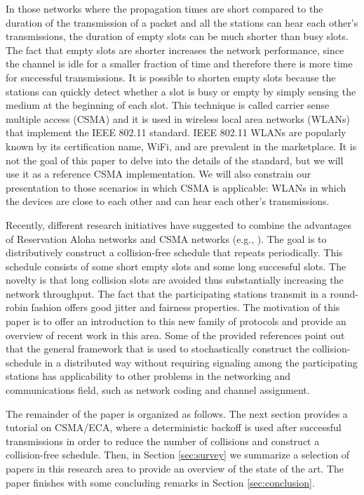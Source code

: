 \documentclass[journal]{IEEEtran}
\begin{document}
In those networks where the propagation times are short compared to the duration of the transmission of a packet and all the stations can hear each other's transmissions, the duration of empty slots can be much shorter than busy slots.
The fact that empty slots are shorter increases the network performance, since the channel is idle for a smaller fraction of time and therefore there is more time for successful transmissions.
It is possible to shorten empty slots because the stations can quickly detect whether a slot is busy or empty by simply sensing the medium at the beginning of each slot.
This technique is called carrier sense multiple access (CSMA) and  it is used in wireless local area networks (WLANs) that implement the IEEE 802.11 standard.
IEEE 802.11 WLANs are popularly known by its certification name, WiFi, and are prevalent in the marketplace.
It is not the goal of this paper to delve into the details of the standard, but we will use it as a reference CSMA implementation.
We will also constrain our presentation to those scenarios in which CSMA is applicable: WLANs in which the devices are close to each other and can hear each other's transmissions.

Recently, different research initiatives have suggested to combine the advantages of Reservation Aloha networks and CSMA networks (e.g., \cite{he2009srb,barcelo2010fcc,fang2011dlm,barcelo2011tcf,martorell2012pec}). 
The goal is to distributively construct a collision-free schedule that repeats periodically.
This schedule consists of some short empty slots and some long successful slots.
The novelty is that long collision slots are avoided thus substantially increasing the network throughput.
The fact that the participating stations transmit in a round-robin fashion offers good jitter and fairness properties.
The motivation of this paper is to offer an introduction to this new family of protocols and provide an overview of recent work in this area.
Some of the provided references point out that the general framework that is used to stochastically construct the collision-schedule in a distributed way without requiring signaling among the participating stations has applicability to other problems in the networking and communications field, such as network coding and channel assignment.

The remainder of the paper is organized as follows.
The next section provides a tutorial on CSMA/ECA, where a deterministic backoff is used after successful transmissions in order to reduce the number of collisions and construct a collision-free schedule. 
Then, in Section \ref{sec:survey} we summarize a selection of papers in this research area to provide an overview of the state of the art. 
The paper finishes with some concluding remarks in Section \ref{sec:conclusion}.
\end{document}

